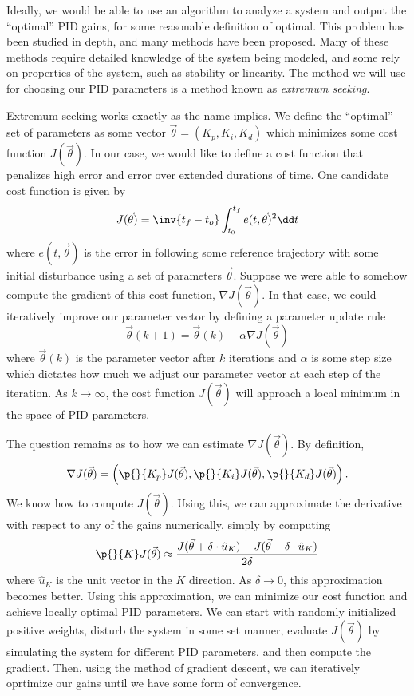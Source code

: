 \documentclass{article}
\begin{document}
Ideally, we would be able to use an algorithm to analyze a system and output the ``optimal'' PID
gains, for some reasonable definition of optimal. This problem has been studied in depth, and many
methods have been proposed. Many of these methods require detailed knowledge of the system being
modeled, and some rely on properties of the system, such as stability or linearity. The method we
will use for choosing our PID parameters is a method known as \emph{extremum seeking}.

Extremum seeking works exactly as the name implies. We define the ``optimal'' set of parameters as
some vector $\vec \theta = (K_p, K_i, K_d)$ which minimizes some cost function $J(\vec\theta)$. In our case, we would
like to define a cost function that penalizes high error and error over extended durations of time.
One candidate cost function is given by
\[J(\vec\theta) = \inv{t_f - t_o} \int_{t_0}^{t_f} e(t, \vec\theta)^2 \dd t\]
where $e(t, \vec\theta)$ is the error in following some reference trajectory with some initial
disturbance using a set of parameters $\vec\theta$. Suppose we were able to somehow compute the
gradient of this cost function, $\nabla J(\vec\theta)$. In that case, we could iteratively improve
our parameter vector by defining a parameter update rule
\[\vec\theta(k + 1) = \vec\theta(k) - \alpha \nabla J(\vec \theta)\]
where $\vec\theta(k)$ is the parameter vector after $k$ iterations and $\alpha$ is some step size
which dictates how much we adjust our parameter vector at each step of the iteration. As
$k\to\infty$, the cost function $J(\vec\theta)$ will approach a local minimum in the space of PID
parameters. 

The question remains as to how we can estimate $\nabla J(\vec\theta)$. By definition,
\[\nabla J(\vec\theta) = \left(\p{ }{K_p} J(\vec\theta), \p{ }{K_i} J(\vec\theta), \p{ }{K_d}
    J(\vec\theta)\right).\]
We  know how to compute $J(\vec\theta)$. Using this, we can approximate the derivative with respect
to any of the gains numerically, simply by computing
\[\p{ }{K} J(\vec\theta) \approx \frac{J(\vec\theta + \delta\cdot \hat{u}_K) - J(\vec\theta-
    \delta\cdot \hat{u}_K)}{2\delta}\] 
where $\hat{u}_K$ is the unit vector in the $K$ direction. As $\delta\to 0$, this approximation
becomes better. Using this approximation, we can minimize our cost function and achieve locally
optimal PID parameters. We can start with randomly initialized positive weights, disturb the system
in some set manner, evaluate $J(\vec\theta)$ by simulating the system for different PID parameters,
and then compute the gradient. Then, using the method of gradient descent, we can iteratively
oprtimize our gains until we have some form of convergence.
\end{document}
